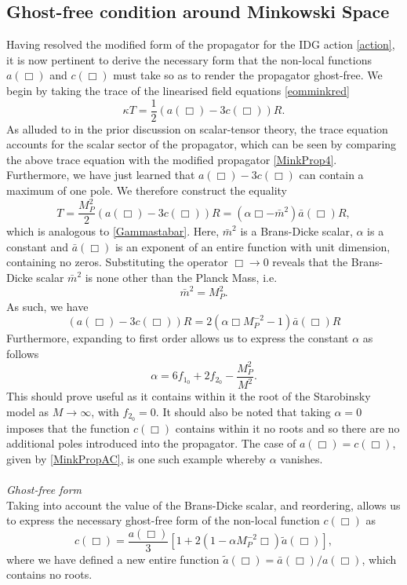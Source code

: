 \subsection{Ghost-free condition around Minkowski Space}
\label{sec:GF}
Having resolved the modified form of the propagator for the IDG action \eqref{action}, it is now pertinent to derive the necessary form that the non-local functions $a(\Box)$ and $c(\Box)$ must take so as to render the propagator ghost-free. We begin by taking the trace of the linearised field equations \eqref{eomminkred}
\[
\label{tracemink2}
\kappa T=\frac{1}{2}(a(\Box)-3c(\Box))R
. \]
As alluded to in the prior discussion on scalar-tensor theory, the trace equation accounts for the scalar sector of the propagator, which can be seen by comparing the above trace equation with the modified propagator \eqref{MinkProp4}. Furthermore, we have just learned that $a(\Box)-3c(\Box)$ can contain a maximum of one pole. We therefore construct the equality
 \[
 \label{GFtrace}
T=\frac{M_P^2}{2} \left(a(\Box)-3c(\Box)\right)R=(\alpha\Box-{\bar m}^{2}){\bar a}(\Box)R
, \]
which is analogous to \eqref{Gammastabar}. Here, ${\bar m}^2$ is a Brans-Dicke scalar, $\alpha$ is a constant and ${\bar a}(\Box)$ is an exponent of an entire function with unit dimension, containing no zeros. Substituting the operator $\Box\rightarrow 0$ reveals that the Brans-Dicke scalar ${\bar m}^2$ is none other than the Planck Mass, i.e.
\[
{\bar m}^2=M_P^2
.\]
As such, we have
\[
\label{a-3cGF}
\left(a(\Box)-3c(\Box)\right)R=2(\alpha\Box M_{P}^{-2}-1){\bar{a}}(\Box)R
 \]
Furthermore, expanding to first order allows us to express the constant $\alpha$ as follows
\[
\label{alpha}
\alpha=6f_{1_{0}}+2f_{2_{0}}-\frac{M_{P}^{2}}{M^{2}}
 .\]
 This should prove useful as it contains within it the root of the Starobinsky model as $M\rightarrow \infty$, with $f_{2_0}=0$. It should also be noted that taking $\alpha=0$ imposes that the function $c(\Box)$ contains within it no roots and so there are no additional poles introduced into the propagator. The case of $a(\Box)=c(\Box)$, given by \eqref{MinkPropAC}, is one such example whereby $\alpha$ vanishes. 
 \\\\
\emph{Ghost-free form}
\\ Taking into account the value of the Brans-Dicke scalar, and reordering, allows us to express the necessary ghost-free form of the non-local function $c(\Box)$ as
\[
\label{GF}
c(\Box)=\frac{a(\Box)}{3}\left[1+2(1-\alpha M_P^{-2}\Box){\tilde a}(\Box)\right]
, \]
where we have defined a new entire function ${\tilde a}(\Box)={\bar a}(\Box)/a(\Box)$, which contains no roots.

